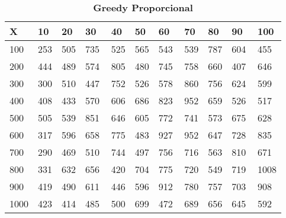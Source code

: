 \documentclass[10pt,letterpaper]{article}
\begin{document}
\begin{center}
\begin{table}\renewcommand{\arraystretch}{2.5}
\caption{\large \textbf{Greedy Proporcional}}
\centering
\begin{tabular} { |m{0.5cm}|m{1.3cm}|m{1.3cm}|m{1.3cm}|m{1.3cm}|m{1.3cm}|m{1.3cm}|m{1.3cm}|m{1.3cm}|m{1.3cm}|m{1.3cm}|} 
\hline
\rowcolor{Gray}
\centering \textbf{X} & \centering \textbf{10} & \centering \textbf{20} & \centering \textbf{30}\ & \centering \textbf{40} & \centering \textbf{50} & \centering \textbf{60}\ & \centering \textbf{70} & \centering \textbf{80} & \centering \textbf{90}\ & \textbf{100} \\\hline
\cellcolor{Gray}100 & \Large 253 & \Large 505 & \Large 735 & \Large 525 & \Large 565 & \Large 543 & \Large 539 & \Large 787 & \Large 604 & \Large 455 \\
\hline
\cellcolor{Gray}200 & \Large 444 & \Large 489 & \Large 574 & \Large 805 & \Large 480 & \Large 745 & \Large 758 & \Large 660 & \Large 407 & \Large 646 \\
\hline
\cellcolor{Gray}300 & \Large 300 & \Large 510 & \Large 447 & \Large 752 & \Large 526 & \Large 578 & \Large 860 & \Large 756 & \Large 624 & \Large 599 \\
\hline
\cellcolor{Gray}400 & \Large 408 & \Large 433 & \Large 570 & \Large 606 & \Large 686 & \Large 823 & \Large 952 & \Large 659 & \Large 526 & \Large 517 \\
\hline
\cellcolor{Gray}500 & \Large 505 & \Large 539 & \Large 851 & \Large 646 & \Large 605 & \Large 772 & \Large 741 & \Large 573 & \Large 675 & \Large 628 \\
\hline
\cellcolor{Gray}600 & \Large 317 & \Large 596 & \Large 658 & \Large 775 & \Large 483 & \Large 927 & \Large 952 & \Large 647 & \Large 728 & \Large 835 \\
\hline
\cellcolor{Gray}700 & \Large 290 & \Large 469 & \Large 510 & \Large 744 & \Large 497 & \Large 756 & \Large 716 & \Large 563 & \Large 810 & \Large 671 \\
\hline
\cellcolor{Gray}800 & \Large 331 & \Large 632 & \Large 656 & \Large 420 & \Large 704 & \Large 775 & \Large 720 & \Large 549 & \Large 719 & \Large 1008 \\
\hline
\cellcolor{Gray}900 & \Large 419 & \Large 490 & \Large 611 & \Large 446 & \Large 596 & \Large 912 & \Large 780 & \Large 757 & \Large 703 & \Large 908 \\
\hline
\cellcolor{Gray}1000 & \Large 423 & \Large 414 & \Large 485 & \Large 500 & \Large 699 & \Large 472 & \Large 689 & \Large 656 & \Large 645 & \Large 592 \\
\hline
\end{tabular} \\
\end{table}
\end{center}
\end{document}
